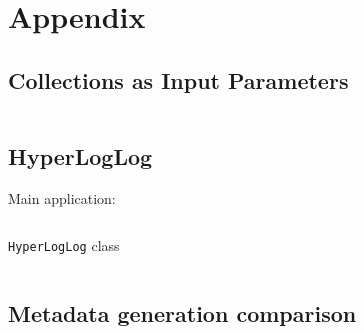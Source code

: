 \section{Appendix}
\label{sec:appendix}

\subsection{Collections as Input Parameters}
\label{subsec:col_in}
\inputminted{python}{applications/COLLECTION_IN/resources_in_master.py}


\subsection{HyperLogLog}
\label{subsec:hyperloglog_source_code}
Main application:
\inputminted{python}{applications/HYPERLOGLOG/main.py}
\verb|HyperLogLog| class
\inputminted{python}{applications/HYPERLOGLOG/HyperLogLog.py}


\subsection{Metadata generation comparison}
\label{subsec:reduce_data_comparison}

